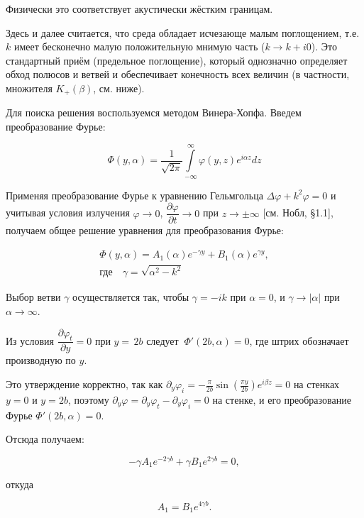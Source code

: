 \documentclass[a4paper,12pt]{article}
\begin{document}
Физически это соответствует акустически жёстким границам.

Здесь и далее считается, что среда обладает исчезающе малым поглощением, т.е. $k$ имеет бесконечно малую положительную мнимую часть ($k \to k + i0$). Это стандартный приём (предельное поглощение), который однозначно определяет обход полюсов и ветвей и обеспечивает конечность всех величин (в частности, множителя $K_+(\beta)$, см. ниже).

Для поиска решения воспользуемся методом Винера-Хопфа. Введем преобразование Фурье:

\begin{equation}
    \Phi(y, \alpha) = \dfrac{1}{\sqrt{2 \pi}} \int \limits_{- \infty}^{\infty} \varphi(y, z) e^{i \alpha z} d z
\end{equation}

Применяя преобразование Фурье к уравнению Гельмгольца $\Delta \varphi + k^2 \varphi = 0$ и учитывая условия излучения $ \varphi \rightarrow 0$, $\dfrac{\partial \varphi}{\partial t} \rightarrow 0$ при $ z \rightarrow \pm \infty$ [см. Нобл, \S 1.1], получаем общее решение уравнения для преобразования Фурье:

\begin{gather}
\Phi(y,\alpha)=A_1(\alpha)e^{-\gamma y}+B_1(\alpha)e^{\gamma y}, \\
\text{где} \quad \gamma = \sqrt{\alpha^2 - k^2}
\end{gather}

Выбор ветви $\gamma$ осуществляется так, чтобы $\gamma = -ik$ при $\alpha = 0$, и $\gamma \rightarrow |\alpha|$ при $\alpha \rightarrow \infty$.

Из условия $\dfrac{\partial \varphi_t}{\partial y} = 0$ при $y =\, 2b$ следует $\ \Phi'(2b,\alpha) = 0 $, где штрих обозначает производную по $y$.

Это утверждение корректно, так как $\partial_y \varphi_i = -\frac{\pi}{2b}\sin\!\left(\frac{\pi y}{2b}\right)e^{i\beta z} = 0$ на стенках $y=0$ и $y=2b$, поэтому $\partial_y\varphi = \partial_y\varphi_t - \partial_y\varphi_i = 0$ на стенке, и его преобразование Фурье $\Phi'(2b, \alpha) = 0$.

Отсюда получаем:

\begin{equation}
-\gamma A_1e^{-2\gamma b} + \gamma B_1 e^{2\gamma b} = 0,
\end{equation}

откуда

\[
A_1=B_1e^{4\gamma b}.
\]
\end{document}
